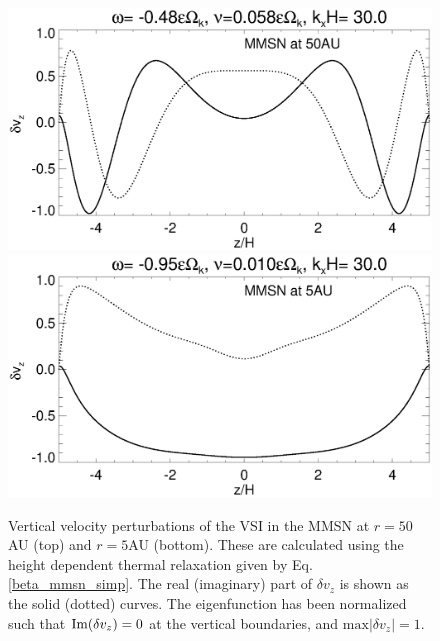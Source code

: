 





\begin{figure}
  \includegraphics[width=\linewidth,clip=true,trim=0cm 1.75cm 0cm
  0cm]{figures/eigenvectorvz_mmsn_50AU}
  \includegraphics[width=\linewidth,clip=true,trim=0cm 0.0cm 0cm
  0cm]{figures/eigenvectorvz_mmsn_5AU}
  \caption{Vertical velocity perturbations of the VSI in the MMSN at 
    $r=50$AU (top) and $r=5$AU (bottom). These are calculated using the height
    dependent thermal relaxation given by Eq. \ref{beta_mmsn_simp}. The real (imaginary) part of 
    $\delta v_z$ is shown as
    the solid (dotted) curves. The eigenfunction has been normalized
    such that $\operatorname{Im}(\delta v_z)=0$ at the vertical boundaries, and
    $\mathrm{max}|\delta v_z|=1$. \label{mmsn_eigenvz}}
\end{figure}
